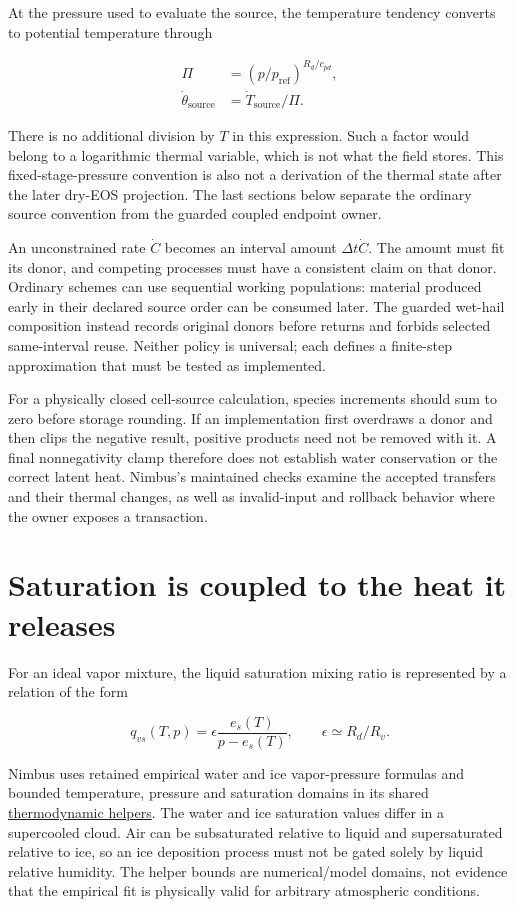 \documentclass[
  11pt,
]{report}
\begin{document}
At the pressure used to evaluate the source, the temperature tendency
converts to potential temperature through

\[\begin{aligned}
\Pi &= (p/p_{\mathrm{ref}})^{R_d/c_{pd}}, \\
\dot\theta_{\mathrm{source}} &= \dot T_{\mathrm{source}}/\Pi.
\end{aligned}\]

There is no additional division by \(T\) in this expression. Such a
factor would belong to a logarithmic thermal variable, which is not what
the field stores. This fixed-stage-pressure convention is also not a
derivation of the thermal state after the later dry-EOS projection. The
last sections below separate the ordinary source convention from the
guarded coupled endpoint owner.

An unconstrained rate \(\dot C\) becomes an interval amount
\(\Delta t\dot C\). The amount must fit its donor, and competing
processes must have a consistent claim on that donor. Ordinary schemes
can use sequential working populations: material produced early in their
declared source order can be consumed later. The guarded wet-hail
composition instead records original donors before returns and forbids
selected same-interval reuse. Neither policy is universal; each defines
a finite-step approximation that must be tested as implemented.

For a physically closed cell-source calculation, species increments
should sum to zero before storage rounding. If an implementation first
overdraws a donor and then clips the negative result, positive products
need not be removed with it. A final nonnegativity clamp therefore does
not establish water conservation or the correct latent heat. Nimbus's
maintained checks examine the accepted transfers and their thermal
changes, as well as invalid-input and rollback behavior where the owner
exposes a transaction.

\section{Saturation is coupled to the heat it
releases}\label{saturation-is-coupled-to-the-heat-it-releases}

For an ideal vapor mixture, the liquid saturation mixing ratio is
represented by a relation of the form

\[q_{vs}(T,p)=\epsilon\frac{e_s(T)}{p-e_s(T)},
\qquad \epsilon\simeq R_d/R_v.\]

Nimbus uses retained empirical water and ice vapor-pressure formulas and
bounded temperature, pressure and saturation domains in its shared
\href{../src/microphysics/base/thermodynamics.hpp}{thermodynamic
helpers}. The water and ice saturation values differ in a supercooled
cloud. Air can be subsaturated relative to liquid and supersaturated
relative to ice, so an ice deposition process must not be gated solely
by liquid relative humidity. The helper bounds are numerical/model
domains, not evidence that the empirical fit is physically valid for
arbitrary atmospheric conditions.
\end{document}

